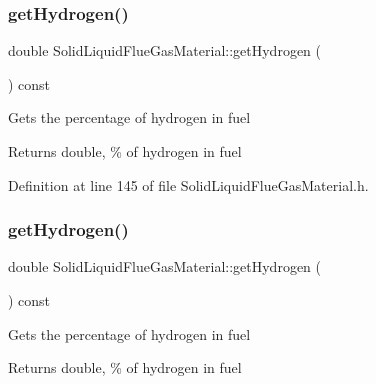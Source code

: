 \mbox{\label{class_solid_liquid_flue_gas_material_a26af2edd53c50b071648d03bc6442fb6}} 
\subsubsection{\texorpdfstring{get\+Hydrogen()}{getHydrogen()}\hspace{0.1cm}{\footnotesize\ttfamily [1/3]}}
{\footnotesize\ttfamily double Solid\+Liquid\+Flue\+Gas\+Material\+::get\+Hydrogen (\begin{DoxyParamCaption}{ }\end{DoxyParamCaption}) const\hspace{0.3cm}{\ttfamily [inline]}}

Gets the percentage of hydrogen in fuel \begin{DoxyReturn}{Returns}
double, \% of hydrogen in fuel 
\end{DoxyReturn}


Definition at line 145 of file Solid\+Liquid\+Flue\+Gas\+Material.\+h.

\mbox{\label{class_solid_liquid_flue_gas_material_a26af2edd53c50b071648d03bc6442fb6}} 
\subsubsection{\texorpdfstring{get\+Hydrogen()}{getHydrogen()}\hspace{0.1cm}{\footnotesize\ttfamily [2/3]}}
{\footnotesize\ttfamily double Solid\+Liquid\+Flue\+Gas\+Material\+::get\+Hydrogen (\begin{DoxyParamCaption}{ }\end{DoxyParamCaption}) const\hspace{0.3cm}{\ttfamily [inline]}}

Gets the percentage of hydrogen in fuel \begin{DoxyReturn}{Returns}
double, \% of hydrogen in fuel 
\end{DoxyReturn}


